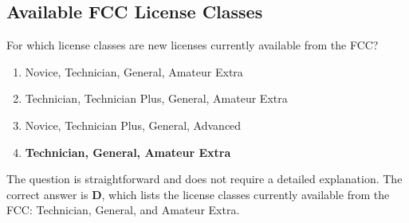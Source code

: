 \subsection{Available FCC License Classes}
\label{T1C01}

\begin{tcolorbox}[colback=gray!10!white,colframe=black!75!black,title=T1C01]
For which license classes are new licenses currently available from the FCC?
\begin{enumerate}[label=\Alph*,noitemsep]
    \item Novice, Technician, General, Amateur Extra
    \item Technician, Technician Plus, General, Amateur Extra
    \item Novice, Technician Plus, General, Advanced
    \item \textbf{Technician, General, Amateur Extra}
\end{enumerate}
\end{tcolorbox}

The question is straightforward and does not require a detailed explanation. The correct answer is \textbf{D}, which lists the license classes currently available from the FCC: Technician, General, and Amateur Extra.